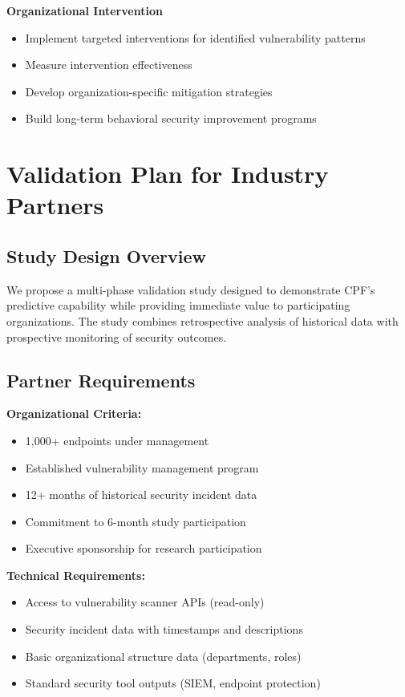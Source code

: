 \documentclass[11pt,a4paper]{article}
\begin{document}
\textbf{Organizational Intervention}
\begin{itemize}
\item Implement targeted interventions for identified vulnerability patterns
\item Measure intervention effectiveness
\item Develop organization-specific mitigation strategies
\item Build long-term behavioral security improvement programs
\end{itemize}

\section{Validation Plan for Industry Partners}

\subsection{Study Design Overview}

We propose a multi-phase validation study designed to demonstrate CPF's predictive capability while providing immediate value to participating organizations. The study combines retrospective analysis of historical data with prospective monitoring of security outcomes.

\subsection{Partner Requirements}

\textbf{Organizational Criteria:}
\begin{itemize}
\item 1,000+ endpoints under management
\item Established vulnerability management program
\item 12+ months of historical security incident data
\item Commitment to 6-month study participation
\item Executive sponsorship for research participation
\end{itemize}

\textbf{Technical Requirements:}
\begin{itemize}
\item Access to vulnerability scanner APIs (read-only)
\item Security incident data with timestamps and descriptions
\item Basic organizational structure data (departments, roles)
\item Standard security tool outputs (SIEM, endpoint protection)
\end{itemize}
\end{document}
